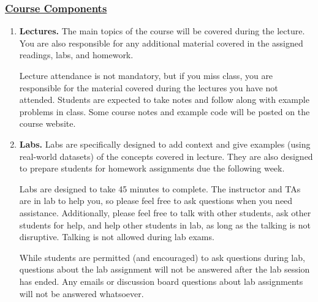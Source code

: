 \documentclass[11pt]{article}
\begin{document}
\vspace*{3mm}

\subsubsection*{\underline{Course Components}}
\begin{enumerate}
\item {\bf Lectures.} The main topics of the course will be covered during the lecture.  You are also responsible for any additional material covered in the assigned readings, labs, and homework.  

Lecture attendance is not mandatory, but if you miss class, you are responsible for the material covered during the lectures you have not attended. %
Students are expected to take notes and follow along with example problems in class.  Some course notes and example code will be posted on the course website.



\item {\bf Labs.}  Labs are specifically designed to add context and give examples (using real-world datasets) of the concepts covered in lecture.  They are also designed to prepare students for homework assignments due the following week.

Labs are designed to take 45 minutes to complete.  The instructor and TAs are in lab to help you, so please feel free to ask questions when you need assistance.  Additionally, please feel free to talk with other students, ask other students for help, and help other students in lab, as long as the talking is not disruptive.  Talking is not allowed during lab exams. 

While students are permitted (and encouraged) to ask questions during lab, questions about the lab assignment will not be answered after the lab session has ended.  Any emails or discussion board questions about lab assignments will not be answered whatsoever. 


\end{enumerate}
\end{document}
